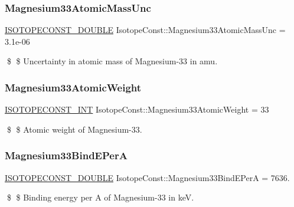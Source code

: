 \subsubsection{\texorpdfstring{Magnesium33\+Atomic\+Mass\+Unc}{Magnesium33AtomicMassUnc}}
{\footnotesize\ttfamily \mbox{\hyperlink{group___isotope_const-_macros_ga8f45a7272ce02c0b4c65c44636ed719a}{I\+S\+O\+T\+O\+P\+E\+C\+O\+N\+S\+T\+\_\+\+D\+O\+U\+B\+LE}} Isotope\+Const\+::\+Magnesium33\+Atomic\+Mass\+Unc = 3.\+1e-\/06}

\$ \$ Uncertainty in atomic mass of Magnesium-\/33 in amu. \mbox{\label{group___isotope_const-_magnesium-_mg33_gaacb9fcdaf49c02834e3807929a81092d}} 
\subsubsection{\texorpdfstring{Magnesium33\+Atomic\+Weight}{Magnesium33AtomicWeight}}
{\footnotesize\ttfamily \mbox{\hyperlink{group___isotope_const-_macros_ga5f18360b3e99483a35c32d789e62621c}{I\+S\+O\+T\+O\+P\+E\+C\+O\+N\+S\+T\+\_\+\+I\+NT}} Isotope\+Const\+::\+Magnesium33\+Atomic\+Weight = 33}

\$ \$ Atomic weight of Magnesium-\/33. \mbox{\label{group___isotope_const-_magnesium-_mg33_gad12dd07fe1be596dfd29d370e80b87fc}} 
\subsubsection{\texorpdfstring{Magnesium33\+Bind\+E\+PerA}{Magnesium33BindEPerA}}
{\footnotesize\ttfamily \mbox{\hyperlink{group___isotope_const-_macros_ga8f45a7272ce02c0b4c65c44636ed719a}{I\+S\+O\+T\+O\+P\+E\+C\+O\+N\+S\+T\+\_\+\+D\+O\+U\+B\+LE}} Isotope\+Const\+::\+Magnesium33\+Bind\+E\+PerA = 7636.}

\$ \$ Binding energy per A of Magnesium-\/33 in keV. \mbox{\label{group___isotope_const-_magnesium-_mg33_gaf622dac7b286cb1befe76c9b9baba5b6}} 
